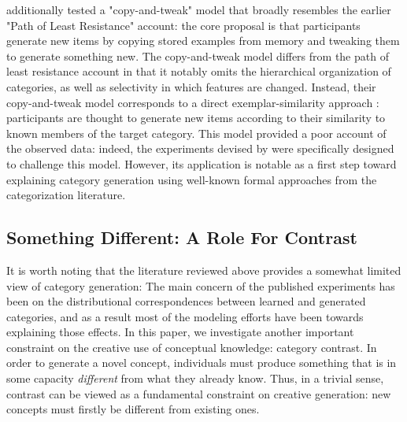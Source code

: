\documentclass[12pt]{article}
\begin{document}
\begin{flushleft}
\cite{jern2013probabilistic} additionally tested a "copy-and-tweak" model that broadly resembles the earlier "Path of Least Resistance" account: the core proposal is that participants generate new items by copying stored examples from memory and tweaking them to generate something new. The copy-and-tweak model differs from the path of least resistance account in that it notably omits the hierarchical organization of categories, as well as selectivity in which features are changed. Instead, their copy-and-tweak model corresponds to a direct exemplar-similarity approach \citep[e.g.,][]{nosofsky1984choice,nosofsky1986attention}: participants are thought to generate new items according to their similarity to known members of the target category. This model provided a poor account of the observed data: indeed, the experiments devised by \citeauthor{jern2013probabilistic} were specifically designed to challenge this model. However, its application is notable as a first step toward explaining category generation using well-known formal approaches from the categorization literature.


\subsection{Something Different: A Role For Contrast}

It is worth noting that the literature reviewed above provides a somewhat limited view of category generation: The main concern of the published experiments has been on the distributional correspondences between learned and generated categories, and as a result most of the modeling efforts have been towards explaining those effects. In this paper, we investigate another important constraint on the creative use of conceptual knowledge: category contrast. In order to generate a novel concept, individuals must produce something that is in some capacity \textit{different} from what they already know. Thus, in a trivial sense, contrast can be viewed as a fundamental constraint on creative generation: new concepts must firstly be different from existing ones. 


\end{flushleft}
\end{document}
